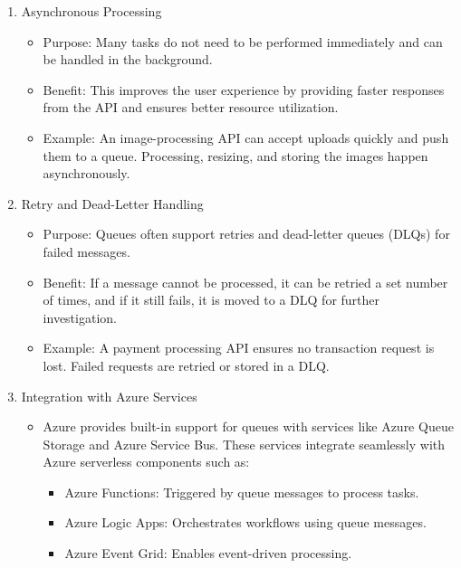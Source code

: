 \documentclass[a4paper,11pt]{article}
\begin{document}
\begin{enumerate}
	\begin{itemize}
		\item Purpose: Queues help control the rate at which messages are processed by downstream services, preventing overload.
		\item Benefit: This protects the system from performance degradation or failures due to resource exhaustion.
		\item Example: The API can accept thousands of requests per second, but the backend may process only a hundred at a time. The queue enforces this limit.
	\end{itemize}
	\item Asynchronous Processing
	\begin{itemize}
		\item Purpose: Many tasks do not need to be performed immediately and can be handled in the background.
		\item Benefit: This improves the user experience by providing faster responses from the API and ensures better resource utilization.
		\item Example: An image-processing API can accept uploads quickly and push them to a queue. Processing, resizing, and storing the images happen asynchronously.
	\end{itemize}
	\item Retry and Dead-Letter Handling
	\begin{itemize}
		\item Purpose: Queues often support retries and dead-letter queues (DLQs) for failed messages.
		\item Benefit: If a message cannot be processed, it can be retried a set number of times, and if it still fails, it is moved to a DLQ for further investigation.
		\item Example: A payment processing API ensures no transaction request is lost. Failed requests are retried or stored in a DLQ.
	\end{itemize}
	\item Integration with Azure Services
	\begin{itemize}
		\item Azure provides built-in support for queues with services like Azure Queue Storage and Azure Service Bus. These services integrate seamlessly with Azure serverless components such as:
		\begin{itemize}
			\item Azure Functions: Triggered by queue messages to process tasks.
			\item Azure Logic Apps: Orchestrates workflows using queue messages.
			\item Azure Event Grid: Enables event-driven processing.
		\end{itemize}
	\end{itemize}
	

\end{enumerate}
\end{document}

